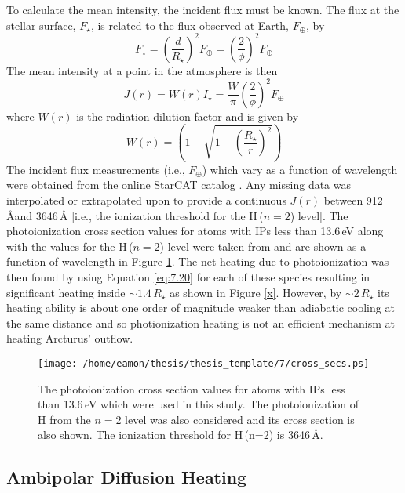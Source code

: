 To calculate the mean intensity, the incident flux must be known. The flux at the stellar surface, $F_{\star}$, is related to the flux observed at Earth, $F_{\oplus}$, by
\begin{equation}
F_{\star}= \left(\frac{d}{R_{\star}}\right)^2F_{\oplus}=\left(\frac{2}{\phi}\right)^2F_{\oplus}
\end{equation}
The mean intensity at a point in the atmosphere is then
\begin{equation}
J(r)=W(r)I_{\star} =\frac{W}{\pi}\left(\frac{2}{\phi}\right)^2F_{\oplus}
\end{equation}
where $W(r)$ is the radiation dilution factor and is given by
\begin{equation}
W(r)=\left(1 - \sqrt{1-\left(\frac{R_{\star}}{r}\right)^2} \right)
\end{equation}
The incident flux measurements (i.e., $F_{\oplus}$) which vary as a function of wavelength were obtained from the online StarCAT catalog \citep{ayres_2010}. Any missing data was interpolated or extrapolated upon to provide a continuous $J(r)$ between 912\,\AA and 3646\,\AA\,\,[i.e., the ionization threshold for the H\,($n=2$) level]. The photoionization cross section values for atoms with IPs less than 13.6\,eV along with the values for the H\,($n=2$) level were taken from \cite{mathisen_1984} and are shown as a function of wavelength in Figure \ref{fig:7.2}. The net heating due to photoionization was then found by using Equation \ref{eq:7.20} for each of these species resulting in significant heating inside $\sim 1.4\,R_{\star}$ as shown in Figure \ref{x}. However, by $\sim 2\,R_{\star}$ its heating ability is about one order of magnitude weaker than adiabatic cooling at the same distance and so photionization heating is not an efficient mechanism at heating Arcturus' outflow.
\begin{figure}[!ht]
\centering 
         \texttt{[image: /home/eamon/thesis/thesis\_template/7/cross\_secs.ps]}
\caption[]{The photoionization cross section values for atoms with IPs less than 13.6\,eV which were used in this study. The photoionization of H from the $n=2$ level was also considered and its cross section is also shown. The ionization threshold for H\,(n=2) is 3646\,\AA .}
\label{fig:7.2}
\end{figure}

\subsection{Ambipolar Diffusion Heating}\label{sec:4.1}